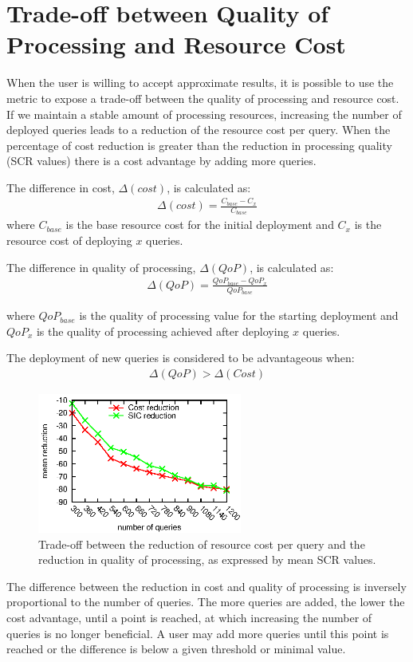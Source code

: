 \section{Trade-off between Quality of Processing and Resource Cost}
\label{sec:cost}
When the user is willing to accept approximate results, it is possible to use the \sic metric to expose
a trade-off between the quality of processing and resource cost. 
If we maintain a stable amount of processing resources, increasing the number of deployed queries
leads to a reduction of the resource cost per query. 
When the percentage of cost reduction is greater than the reduction in processing quality (\ie SCR
values) there is a cost advantage by adding more queries. 

The difference in cost, $\Delta(cost)$, is calculated as:
\begin{align}
	\Delta(cost) = \frac{C_{base}-C_x}{C_{base}}
\end{align}
where $C_{base}$ is the base resource cost for the initial deployment and $C_x$ is the resource cost of
deploying $x$ queries.

The difference in quality of processing, $\Delta(QoP)$, is calculated as:
\begin{align}
	\Delta(QoP) = \frac{QoP_{base}-QoP_x}{QoP_{base}}
\end{align}

where $QoP_{base}$ is the quality of processing value for the starting deployment and $QoP_x$ is the
quality of processing achieved after deploying $x$ queries.

The deployment of new queries is considered to be advantageous when:
\begin{align}
	\Delta(QoP)>\Delta(Cost)
\end{align}
\begin{figure} 
\centering 
\includegraphics[width=0.6\textwidth]{img/tesi/cost2}  
\caption{Trade-off between the reduction of resource cost per query and the reduction in quality of
processing, as expressed by mean SCR values.}
\label{fig:tradeoff-mean}
\end{figure}
The difference between the reduction in cost and quality of processing is inversely proportional to the
number of queries. The more queries are added, the lower the cost advantage, until a point is reached,
at which increasing the number of queries is no longer beneficial.
A user may add more queries until this point is reached or the difference is below a given threshold or
minimal \sic value.

